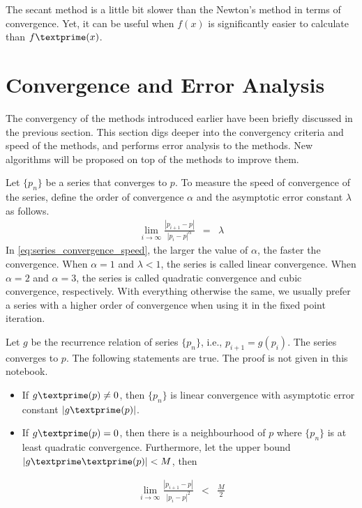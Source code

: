 The secant method is a little bit slower than the Newton's method in terms of convergence. Yet, it can be useful when $f(x)$ is significantly easier to calculate than $f\textprime(x)$.

\section{Convergence and Error Analysis}

The convergency of the methods introduced earlier have been briefly discussed in the previous section. This section digs deeper into the convergency criteria and speed of the methods, and performs error analysis to the methods. New algorithms will be proposed on top of the methods to improve them.

Let $\{p_n\}$ be a series that converges to $p$. To measure the speed of convergence of the series, define the order of convergence $\alpha$ and the asymptotic error constant $\lambda$ as follows.
\begin{eqnarray}
  \lim_{i\rightarrow\infty} \frac{|p_{i+1}-p|}{|p_i-p|^\alpha} &=& \lambda \label{eq:series_convergence_speed}
\end{eqnarray}
In \eqref{eq:series_convergence_speed}, the larger the value of $\alpha$, the faster the convergence. When $\alpha=1$ and $\lambda < 1$, the series is called linear convergence. When $\alpha=2$ and $\alpha=3$, the series is called quadratic convergence and cubic convergence, respectively. With everything otherwise the same, we usually prefer a series with a higher order of convergence when using it in the fixed point iteration.

Let $g$ be the recurrence relation of series $\{p_n\}$, i.e., $p_{i+1} = g(p_i)$. The series converges to $p$. The following statements are true. The proof is not given in this notebook.
\begin{itemize}
  \item If $g\textprime(p)\neq0$, then $\{p_n\}$ is linear convergence with asymptotic error constant $|g\textprime(p)|$.
  \item If $g\textprime(p)=0$, then there is a neighbourhood of $p$ where $\{p_n\}$ is at least quadratic convergence. Furthermore, let the upper bound $|g\textprime\textprime(p)| < M$, then
\end{itemize} 
\begin{eqnarray}
  \lim_{i\rightarrow\infty} \frac{|p_{i+1}-p|}{|p_i-p|^2} &<& \frac{M}{2} \nonumber
\end{eqnarray}

